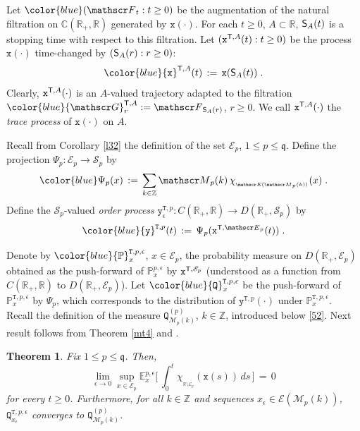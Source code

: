 \documentclass[reqno]{amsart}
\theoremstyle{plain}
\newtheorem{theorem}{Theorem}[section]
\theoremstyle{definition}
\newcommand{\mf}[1]{{\mathfrak #1}}
\newcommand{\bb}[1]{{\mathbb #1}}
\newcommand{\ms}[1]{{\mathscr #1}}
\newcommand{\mss}[1]{{\textsf #1}}
\newcommand{\mtt}[1]{{\mathtt #1}}
\newcounter{as}[section]
\newcommand{\<}{\langle}
\renewcommand{\>}{\rangle}
\begin{document}
Let $\color{blue} (\ms F_{t} : t\ge 0)$ be the augmentation of the
natural filtration on $\bb C(\bb R_{+}, \bb R)$ generated by
$\mtt x(\cdot)$. For each $t\ge 0$, $A\subset \bb R$, $\mss S_A(t)$ is
a stopping time with respect to this filtration. Let
$(\mtt x^{\mss T, A} (t) : t\ge 0)$ be the process
$\mtt x (\cdot)$ time-changed by
$(\mss S_A (r) : r\ge 0)$:
\begin{equation}
\label{25}
{\color{blue} \mtt x^{\mss T, A} (t)} \,: =\,
\mtt x (\mss S_A(t))\;.
\end{equation}
Clearly, $\mtt x^{\mss T, A}(\cdot)$ is an $A$-valued trajectory
adapted to the filtration
$\color{blue} \ms G^{\mss T, A}_r := \ms F_{\mss S_A (r)}$, $r\ge
0$. We call $\mtt x^{\mss T, A} (\cdot)$ the \emph{trace process} of
$\mtt x(\cdot)$ on $A$.

Recall from Corollary \ref{l32} the definition of the set $\ms E_p$,
$1\le p\le \mf q$.
Define the projection $\Psi_p\colon \ms E_p \to \ms S_p$ by
\begin{equation*}
{\color{blue} \Psi_p(x)} \,:=\, \sum_{k\in\bb Z}  \ms M_p(k) \,
\chi_{_{\ms E (\ms M_p(k))}} (x)\;.
\end{equation*}
Define the $\ms S_p$-valued \emph{order process}
$\mtt y^{{\mtt T}, p}_\epsilon \colon C(\bb R_+, \bb R) \to D(\bb R_+,
\ms S_p)$ by
\begin{equation*}
{\color{blue}  \mtt y^{{\mtt T}, p} (t)} \,: =\,
\Psi_p(\mtt x^{\mss T, \ms E_p} (t))\;.
\end{equation*}

Denote by $\color{blue} \bb P_{x}^{{\mtt T}, p, \epsilon}$,
$x\in \ms E_p$, the probability measure on $D(\bb R_+, \ms E_p)$
obtained as the push-forward of $\bb P_{x}^{p, \epsilon}$ by
$\mtt x^{\mss T, \ms E_p}$ (understood as a function from
$C(\bb R_+, \bb R)$ to $D(\bb R_+, \ms E_p)$). Let
$\color{blue} \mtt Q_{x}^{{\mtt T}, p, \epsilon}$ be the push-forward
of $\bb P_{x}^{{\mtt T}, p, \epsilon}$ by $\Psi_p$, which corresponds
to the distribution of $\mtt y^{{\mtt T}, p}(\cdot)$ under
$\bb P_{x}^{{\mtt T}, p, \epsilon}$. Recall the definition of the
measure $\mtt Q_{\ms M_p(k)}^{(p)}$, $k\in \bb Z$, introduced below
\eqref{52}.  Next result follows from Theorem \ref{mt4} and
\cite[Theorem 2.3]{lms}.

\begin{theorem}
\label{l29}
Fix $1\le p\le \mf q$. Then,
\begin{equation}
\label{23}
\lim_{\epsilon \to 0} \sup_{x\in \ms E_p}
\bb E_{x}^{p,\epsilon}\Big[ \, \int_{0}^{t}
\chi_{_{\bb R \setminus \ms E_p}}
(\mtt x (s))\,  ds \, \Big]
\,=\, 0
\end{equation}
for every $t\geq 0$. Furthermore, for all $k\in \bb Z$ and sequences
$x_\epsilon \in \ms E(\ms M_p(k))$, {\rm
${\mtt Q}_{x_\epsilon}^{{\mtt T}, p, \epsilon}$} converges to {\rm
${\mtt Q}_{\ms M_p(k)}^{(p)}$}.
\end{theorem}
\end{document}
